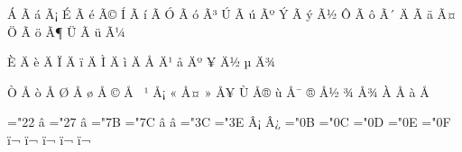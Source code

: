 
\mubyte ^^c1  ^^c3^^81\endmubyte %
\mubyte ^^e1  ^^c3^^a1\endmubyte %
\mubyte ^^c9  ^^c3^^89\endmubyte %
\mubyte ^^e9  ^^c3^^a9\endmubyte %
\mubyte ^^cd  ^^c3^^8d\endmubyte %
\mubyte ^^ed  ^^c3^^ad\endmubyte %
\mubyte ^^d3  ^^c3^^93\endmubyte %
\mubyte ^^f3  ^^c3^^b3\endmubyte %
\mubyte ^^da  ^^c3^^9a\endmubyte %
\mubyte ^^fa  ^^c3^^ba\endmubyte %
\mubyte ^^dd  ^^c3^^9d\endmubyte %
\mubyte ^^fd  ^^c3^^bd\endmubyte %
\mubyte ^^d4  ^^c3^^94\endmubyte %
\mubyte ^^f4  ^^c3^^b4\endmubyte %
\mubyte ^^c4  ^^c3^^84\endmubyte %
\mubyte ^^e4  ^^c3^^a4\endmubyte %
\mubyte ^^d6  ^^c3^^96\endmubyte %
\mubyte ^^f6  ^^c3^^b6\endmubyte %
\mubyte ^^dc  ^^c3^^9c\endmubyte %
\mubyte ^^fc  ^^c3^^bc\endmubyte %

\mubyte ^^c8  ^^c4^^8c\endmubyte %
\mubyte ^^e8  ^^c4^^8d\endmubyte %
\mubyte ^^cf  ^^c4^^8e\endmubyte %
\mubyte ^^ef  ^^c4^^8f\endmubyte %
\mubyte ^^cc  ^^c4^^9a\endmubyte %
\mubyte ^^ec  ^^c4^^9b\endmubyte %
\mubyte ^^c5  ^^c4^^b9\endmubyte %
\mubyte ^^e5  ^^c4^^ba\endmubyte %
\mubyte ^^a5  ^^c4^^bd\endmubyte %
\mubyte ^^b5  ^^c4^^be\endmubyte %

\mubyte ^^d2  ^^c5^^87\endmubyte %
\mubyte ^^f2  ^^c5^^88\endmubyte %
\mubyte ^^d8  ^^c5^^98\endmubyte %
\mubyte ^^f8  ^^c5^^99\endmubyte %
\mubyte ^^a9  ^^c5^^a0\endmubyte %
\mubyte ^^b9  ^^c5^^a1\endmubyte %
\mubyte ^^ab  ^^c5^^a4\endmubyte %
\mubyte ^^bb  ^^c5^^a5\endmubyte %
\mubyte ^^d9  ^^c5^^ae\endmubyte %
\mubyte ^^f9  ^^c5^^af\endmubyte %
\mubyte ^^ae  ^^c5^^bd\endmubyte %
\mubyte ^^be  ^^c5^^be\endmubyte %
\mubyte ^^c0  ^^c5^^94\endmubyte %
\mubyte ^^e0  ^^c5^^95\endmubyte %

\chardef\erqq="22
\mubyte \erqq ^^e2^^80^^9d\endmubyte %
\chardef\erq="27
\mubyte \erq ^^e2^^80^^99\endmubyte %
\chardef\endash="7B
\chardef\emdash="7C
\mubyte \endash ^^e2^^80^^93\endmubyte %
\mubyte \emdash ^^e2^^80^^94\endmubyte %
\chardef\utfinvexclamation="3C
\chardef\utfinvquestion="3E
\mubyte \utfinvexclamation ^^c2^^a1\endmubyte %
\mubyte \utfinvquestion ^^c2^^bf\endmubyte %
\chardef\utfligatureff="0B
\chardef\utfligaturefi="0C
\chardef\utfligaturefl="0D
\chardef\utfligatureffi="0E
\chardef\utfligatureffl="0F
\mubyte \utfligatureff ^^ef^^ac^^80\endmubyte %
\mubyte \utfligaturefi ^^ef^^ac^^81\endmubyte %
\mubyte \utfligaturefl ^^ef^^ac^^82\endmubyte %
\mubyte \utfligatureffi ^^ef^^ac^^83\endmubyte %
\mubyte \utfligatureffl ^^ef^^ac^^84\endmubyte %

